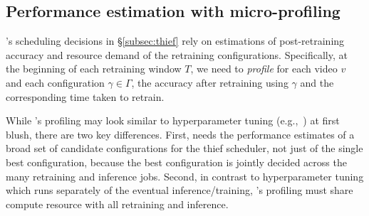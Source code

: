 


\subsection{Performance estimation with micro-profiling}
\label{subsec:profiling}

{\name}'s scheduling decisions in \S\ref{subsec:thief} rely on estimations of post-retraining accuracy and resource demand of the retraining configurations. 
Specifically, at the beginning of each retraining window $T$, we need to {\em profile} for each video $v$ and each configuration $\gamma\in\Gamma$, the accuracy after retraining using $\gamma$ and the corresponding time taken to retrain.%

While \name's profiling may look similar to hyperparameter tuning (e.g.,~\cite{DBLP:conf/nips/SnoekLA12,DBLP:journals/jmlr/LiJDRT17,hypersched,rubberband}) at first blush, there are two key differences. 
First, \name needs the performance estimates of a broad set of candidate configurations for the thief scheduler, not just of the single best configuration, because the best configuration is jointly decided across the many retraining and inference jobs. 
Second, in contrast to hyperparameter tuning which runs separately of the eventual inference/training, \name's profiling must share compute resource with all retraining and inference.%

